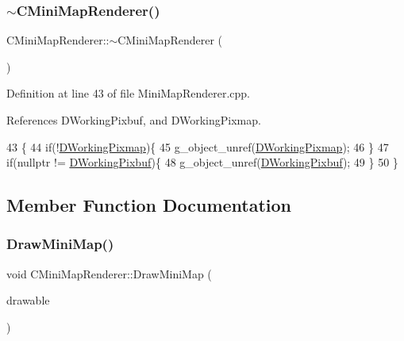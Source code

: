 \subsubsection{\texorpdfstring{$\sim$\+C\+Mini\+Map\+Renderer()}{~CMiniMapRenderer()}}
{\footnotesize\ttfamily C\+Mini\+Map\+Renderer\+::$\sim$\+C\+Mini\+Map\+Renderer (\begin{DoxyParamCaption}{ }\end{DoxyParamCaption})}



Definition at line 43 of file Mini\+Map\+Renderer.\+cpp.



References D\+Working\+Pixbuf, and D\+Working\+Pixmap.


\begin{DoxyCode}
43                                    \{
44     \textcolor{keywordflow}{if}(!\hyperlink{classCMiniMapRenderer_a53bf622d2048ea136ae256e8d4b81fb5}{DWorkingPixmap})\{
45         g\_object\_unref(\hyperlink{classCMiniMapRenderer_a53bf622d2048ea136ae256e8d4b81fb5}{DWorkingPixmap});
46     \}
47     \textcolor{keywordflow}{if}(\textcolor{keyword}{nullptr} != \hyperlink{classCMiniMapRenderer_ad5f723d83a60882a3e82af72e84ff522}{DWorkingPixbuf})\{
48         g\_object\_unref(\hyperlink{classCMiniMapRenderer_ad5f723d83a60882a3e82af72e84ff522}{DWorkingPixbuf});
49     \}
50 \}
\end{DoxyCode}


\subsection{Member Function Documentation}
\hypertarget{classCMiniMapRenderer_aa7f3db866eeea3f92725f2b25ceee23c}{}\label{classCMiniMapRenderer_aa7f3db866eeea3f92725f2b25ceee23c} 
\subsubsection{\texorpdfstring{Draw\+Mini\+Map()}{DrawMiniMap()}}
{\footnotesize\ttfamily void C\+Mini\+Map\+Renderer\+::\+Draw\+Mini\+Map (\begin{DoxyParamCaption}\item[{Gdk\+Drawable $\ast$}]{drawable }\end{DoxyParamCaption})}




